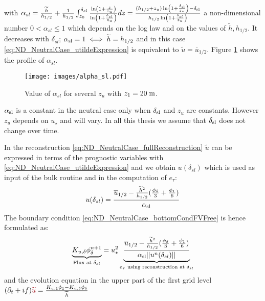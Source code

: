 with $\alpha_{sl} =
\frac{\widetilde{h}}{{h_{1/2}}} + \frac{1}{{h_{1/2}}}\int_{z_0}^{\delta_{sl}}
\frac{\ln(1+\frac{z}{z_{u}})}{\ln(1+\frac{\delta_{sl}}{z_{u}})}dz
= \frac{(h_{1/2} + z_{u})
\ln(1+\frac{\delta_{\rm sl}}{z_{u}}) - \delta_{\rm sl}}{
	h_{1/2}\ln(1+\frac{\delta_{sl}}{z_{u}})}$ a non-dimensional
number $0 < \alpha_{sl} \leq 1$ which depends on the log law and
on the values of $\widetilde{h}, h_{1/2}$. It decreases with
$\delta_{sl}$; $\alpha_{\rm sl} = 1 \iff \widetilde{h}=h_{1/2}$
and in this case \eqref{eq:ND_NeutralCase_utildeExpression} is
equivalent to $\widetilde{u} = \overline{u}_{1/2}$.
Figure \ref{fig:ND_NeutralCase_alpha_sl} shows the
profile of $\alpha_{sl}$.
\begin{figure}
	\centering
	\texttt{[image: images/alpha\_sl.pdf]}
	\caption
	{ Value of $\alpha_{sl}$
	for several $z_u$ with $z_1=20\;{\rm m}$.
	}
	\label{fig:ND_NeutralCase_alpha_sl}
\end{figure}
\begin{remark}
$\alpha_{\rm sl}$ is a constant in the neutral case
only when $\delta_{\rm sl}$ and $z_{u}$ are constants. However
$z_{u}$ depends on $u_\star$ and will vary.
In all this thesis we assume that $\delta_{\rm sl}$ does not
change over time.
\end{remark}
%
In the reconstruction \eqref{eq:ND_NeutralCase_fullReconstruction}
$\widetilde{u}$ can be expressed in terms of the prognostic
variables with \eqref{eq:ND_NeutralCase_utildeExpression}
and we obtain $u(\delta_{sl})$ which is used as input
of the bulk routine and in the computation of $e_\tau$:
\begin{equation}
u(\delta_{sl})=\frac{\overline{u}_{1/2} -
	\frac{\widetilde{h}^2}{h_{1/2}}
	(\frac{\phi_{\delta}}{3} + \frac{\phi_1}{6})}
	{\alpha_{\rm sl}}
\end{equation}
The boundary condition \eqref{eq:ND_NeutralCase_bottomCondFVFree}
is hence formulated as:
\begin{equation}
	\label{eq:ND_NeutralCase_boundaryCondFVfree}
	\underbrace{K_{u,\delta} {\phi}^{n+1}_{\delta}}_{
		\text{Flux at } \delta_{sl}
	} = u_\star^2
	\underbrace{\frac{\overline{u}_{1/2} -
	\frac{\widetilde{h}^2}{h_{1/2}}
	(\frac{\phi_{\delta}}{3} + \frac{\phi_1}{6})}
	{\alpha_{\rm sl}||u^n(\delta_{sl}) ||}}_{
		e_\tau \text{ using reconstruction at } \delta_{sl}
	}
\end{equation}
and the evolution equation in the upper part of the first grid level
$ (\partial_t+if) \emphase{\widetilde{u}}
= \frac{K_{u, 1}\phi_1 - K_{u,\delta} \phi_{\delta}}{\widetilde{h}}$
